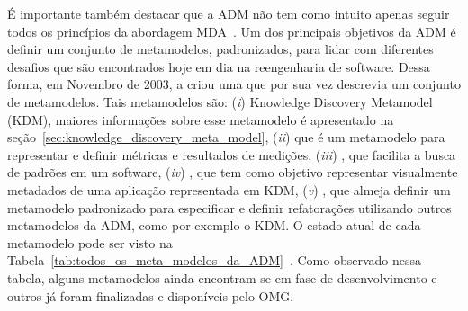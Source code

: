 É importante também destacar que a ADM não tem como intuito apenas seguir todos os princípios da abordagem MDA~\cite{ADM:OMG}. Um dos principais objetivos da ADM é definir um conjunto de metamodelos, padronizados, para lidar com diferentes desafios que são encontrados hoje em dia na reengenharia de software. Dessa forma, em Novembro de 2003, a  criou uma  que por sua vez descrevia um conjunto de metamodelos. Tais metamodelos são: (\textit{i}) Knowledge Discovery Metamodel (KDM), maiores informações sobre esse metamodelo é apresentado na seção~\ref{sec:knowledge_discovery_meta_model}, (\textit{ii})  que é um metamodelo para representar e definir métricas e resultados de medições, (\textit{iii}) , que facilita a busca de padrões em um software, (\textit{iv}) , que tem como objetivo representar visualmente metadados de uma aplicação representada em KDM, (\textit{v}) , que almeja definir um metamodelo padronizado para especificar e definir refatorações utilizando outros metamodelos da ADM, como por exemplo o KDM. O estado atual de cada metamodelo pode ser visto na Tabela~\ref{tab:todos_os_meta_modelos_da_ADM}~\cite{ADM:OMG}. Como observado nessa tabela, alguns metamodelos ainda encontram-se em fase de desenvolvimento e outros já foram finalizadas e disponíveis pelo OMG.

